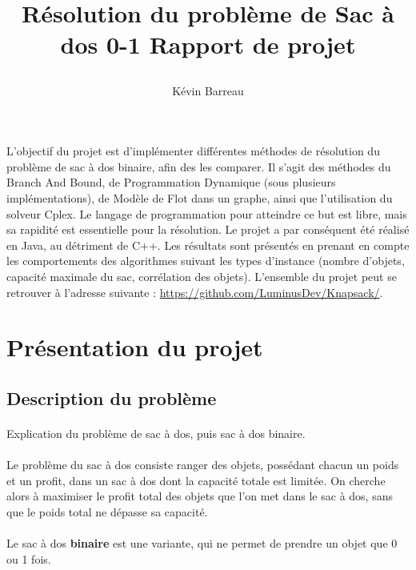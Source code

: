 \documentclass[12pt]{article}
\title{
 \begin{minipage}\linewidth
        \centering
        Résolution du problème de Sac à dos 0-1
        \vskip3pt
        \large Rapport de projet
    \end{minipage}
 }
\author{Kévin Barreau}
\begin{document}
\maketitle

\abstract
L'objectif du projet est d'implémenter différentes méthodes de résolution du problème de sac à dos binaire, afin des les comparer. Il s'agit des méthodes du Branch And Bound, de Programmation Dynamique (sous plusieurs implémentations), de Modèle de Flot dans un graphe, ainsi que l'utilisation du solveur Cplex. Le langage de programmation pour atteindre ce but est libre, mais sa rapidité est essentielle pour la résolution. Le projet a par conséquent été réalisé en Java, au détriment de C++. Les résultats sont présentés en prenant en compte les comportements des algorithmes suivant les types d'instance (nombre d'objets, capacité maximale du sac, corrélation des objets). L'ensemble du projet peut se retrouver à l'adresse suivante : \url{https://github.com/LuminusDev/Knapsack/}.

\newpage

\renewcommand{\contentsname}{Sommaire} 
\tableofcontents

\newpage

\section{Présentation du projet}

\subsection{Description du problème}

\paragraph{}Explication du problème de sac à dos, puis sac à dos binaire.

\paragraph{}Le problème du sac à dos consiste ranger des objets, possédant chacun un poids et un profit, dans un sac à dos dont la capacité totale est limitée. On cherche alors à maximiser le profit total des objets que l'on met dans le sac à dos, sans que le poids total ne dépasse sa capacité.
\paragraph{}Le sac à dos \textbf{binaire} est une variante, qui ne permet de prendre un objet que 0 ou 1 fois.
\end{document}
